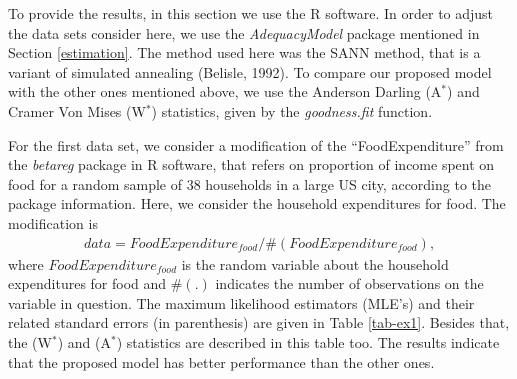 \documentclass[12pt,a4paper]{article} %
\begin{document}
To provide the results, in this section we use the {\sf R} software. In order to adjust the data sets consider here, we use the {\it AdequacyModel} package mentioned in Section \ref{estimation}. The method used here was the SANN method, that is a variant of simulated annealing (Belisle, 1992). To compare our proposed model with the other ones mentioned above, we use the Anderson Darling (A$^{*}$) and Cramer Von Mises (W$^{*}$) statistics, given by the {\it goodness.fit} function.

For the first data set, we consider a modification of the ``FoodExpenditure'' from the {\it betareg} package in {\sf R} software, that refers  on proportion of income spent on food for a random sample of 38 households in a large US city, according to the package information. Here, we consider the household expenditures for food. The modification is
\begin{eqnarray*}
data = FoodExpenditure_{food} / \#(FoodExpenditure_{food}),
\end{eqnarray*}
where $FoodExpenditure_{food}$ is the random variable about the household expenditures for food and $\#(.)$ indicates the number of observations on the variable in question. The maximum likelihood estimators (MLE's) and their related standard errors (in parenthesis) are given in Table \ref{tab-ex1}. Besides that, the (W$^{*}$) and (A$^{*}$) statistics are described in this table too. The results indicate that the proposed model has better performance than the other ones.
\end{document}
